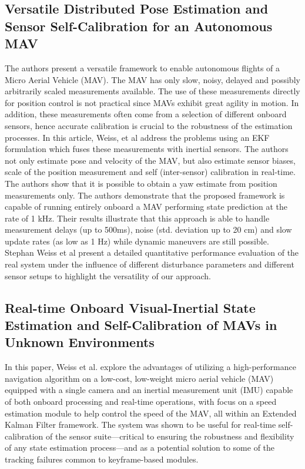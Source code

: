 \subsection{Versatile Distributed Pose Estimation and Sensor Self-Calibration for an Autonomous MAV}

The authors present a versatile framework to enable autonomous ﬂights of a Micro Aerial Vehicle (MAV). The MAV has only slow, noisy, delayed and possibly arbitrarily scaled measurements available. The use of these measurements directly for position control is not practical since MAVs exhibit great agility in motion. In addition, these measurements often come from a selection of different onboard sensors, hence accurate calibration is crucial to the robustness of the estimation processes. In this article, Weiss, et al address the problems using an EKF formulation which fuses these measurements with inertial sensors. The authors not only estimate pose and velocity of the MAV, but also estimate sensor biases, scale of the position measurement and self (inter-sensor) calibration in real-time. The authors show that it is possible to obtain a yaw estimate from position measurements only. The authors demonstrate that the proposed framework is capable of running entirely onboard a MAV performing state prediction at the rate of 1 kHz. Their results illustrate that this approach is able to handle measurement delays (up to 500ms), noise (std. deviation up to 20 cm) and slow update rates (as low as 1 Hz) while dynamic maneuvers are still possible. Stephan Weiss et al present a detailed quantitative performance evaluation of the real system under the inﬂuence of different disturbance parameters and different sensor setups to highlight the versatility of our approach.

\subsection{Real-time Onboard Visual-Inertial State Estimation and Self-Calibration of MAVs in Unknown Environments}

In this paper, Weiss et al. explore the advantages of utilizing a high-performance navigation algorithm on a low-cost, low-weight micro aerial vehicle (MAV) equipped with a single camera and an inertial measurement unit (IMU) capable of both onboard processing and real-time operations, with focus on a speed estimation module to help control the speed of the MAV, all within an Extended Kalman Filter framework. The system was shown to be useful for real-time self-calibration of the sensor suite---critical to ensuring the robustness and flexibility of any state estimation process---and as a potential solution to some of the tracking failures common to keyframe-based modules.

